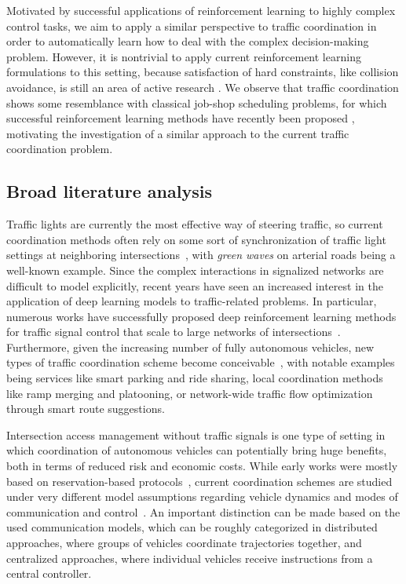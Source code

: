 \documentclass[notitlepage]{report}
\begin{document}
Motivated by successful applications of reinforcement learning to highly complex
control tasks, we aim to apply a similar perspective to traffic coordination in
order to automatically learn how to deal with the complex decision-making problem.
However, it is nontrivial to apply current reinforcement learning formulations to
this setting, because satisfaction of hard constraints, like collision
avoidance, is still an area of active research
\cite{minHardConstrainedNeuralNetworks2024}.
We observe that traffic coordination shows some resemblance with classical
job-shop scheduling problems, for which successful reinforcement learning
methods have recently been proposed
\cite{zhangLearningDispatchJob2020,zhangDeepReinforcementLearning2024,smitGraphNeuralNetworks2024},
motivating the investigation of a similar approach to the current traffic
coordination problem.


\subsection*{Broad literature analysis}

Traffic lights are currently the most effective way of steering traffic, so
current coordination methods often rely on some sort of synchronization of
traffic light settings at neighboring intersections~\cite{mcshaneTrafficEngineering1990,hePAMSCODPlatoonbasedArterial2012}, with \textit{green waves} on
arterial roads being a well-known example. Since the complex interactions in
signalized networks are difficult to model explicitly, recent years have seen an
increased interest in the application of deep learning models to traffic-related
problems. In particular, numerous works have successfully proposed deep
reinforcement learning methods for traffic signal control that scale to large
networks of intersections~\cite{noaeenReinforcementLearningUrban2022,weiSurveyTrafficSignal2020}.
%
Furthermore, given the increasing number of fully autonomous vehicles, new types of traffic
coordination scheme become
conceivable~\cite{marianiCoordinationAutonomousVehicles2022}, with notable
examples being services like smart parking and ride sharing, local coordination
methods like ramp merging and platooning, or network-wide traffic flow
optimization through smart route suggestions.

Intersection access management without traffic signals is one type of setting in
which coordination of autonomous vehicles can potentially bring huge benefits,
both in terms of reduced risk and economic costs. While early works were mostly
based on reservation-based
protocols~\cite{dresnerMultiagentApproachAutonomous2008}, current coordination
schemes are studied under very different model assumptions regarding vehicle
dynamics and modes of communication and
control~\cite{khayatianSurveyIntersectionManagement2020}. An important
distinction can be made based on the used communication models, which can be
roughly categorized in distributed approaches, where groups of vehicles
coordinate trajectories together, and centralized approaches, where individual
vehicles receive instructions from a central controller.
\end{document}
